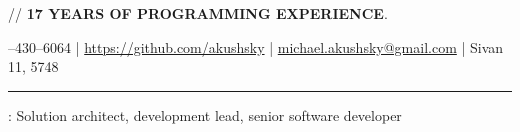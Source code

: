 \documentclass[11pt]{article}
\newif\ifdetailed
\begin{document}
%
{\small{// {\textbf{17 YEARS OF PROGRAMMING EXPERIENCE}}. }}

\vspace{0.5em}

--430--6064    |    \url{https://github.com/akushsky}   |   \href{mailto:michael.akushsky@gmail.com}{michael.akushsky@gmail.com}  | Sivan 11, 5748

\vspace{0.5em}

\hrule

\vspace{1.5em}

\ifdetailed
\noindent {\textbf{CAREER OBJECTIVE}}: To gain \textbf{international experience} in hi-tech related role (solution architect, tech lead, senior software engineer). Preferably working with highload systems, big data and distributed software.
\else
{}: Solution architect, development lead, senior software developer
\fi

\vspace{1em}
\end{document}
